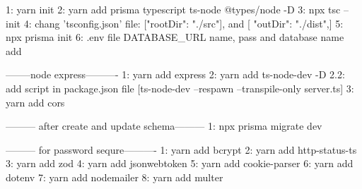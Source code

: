 1: yarn init
2: yarn add prisma typescript ts-node @types/node -D
3: npx tsc --init
4: chang 'tsconfig.json' file: ["rootDir": "./src"],   and [ "outDir": "./dist",]
5: npx prisma init
6: .env file DATABASE_URL name, pass and database name add



--------node express----------
1: yarn add express
2: yarn add ts-node-dev -D
2.2: add script in package.json file [ts-node-dev --respawn --transpile-only server.ts]
3: yarn add cors

--------- after create and update schema---------
1: npx prisma migrate dev


--------- for password sequre----------
1: yarn add bcrypt
2: yarn add http-status-ts
3: yarn add zod
4: yarn add jsonwebtoken
5: yarn add cookie-parser
6: yarn add dotenv
7: yarn add nodemailer
8: yarn add multer